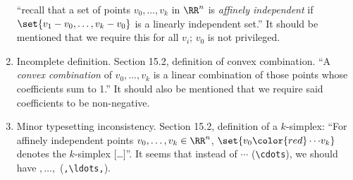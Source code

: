 \documentclass{fkletter}
\begin{document}
\begin{enumerate}
    ``recall that a set of points $v_0, \ldots, v_k$ in $\RR^n$ is
    \emph{affinely independent} if $\set{v_1 - v_0, \ldots, v_k - v_0}$ is a
    linearly independent set.'' It should be mentioned that we require this for
    all $v_i$; $v_0$ is not privileged.
  \item Incomplete definition. Section 15.2, definition of convex combination.
    ``A \emph{convex combination} of $v_0, \ldots, v_k$ is a linear combination
    of those points whose coefficients sum to 1.'' It should also be mentioned
    that we require said coefficients to be non-negative.
  \item Minor typesetting inconsistency. Section 15.2, definition of a
    $k$-simplex: ``For affinely independent points $v_0, \ldots, v_k \in \RR^n$,
    $\set{v_0 {\color{red} \cdots} v_k}$ denotes the $k$-simplex [\ldots]''. It
    seems that instead of $\cdots$ (\verb|\cdots|), we should have $,\ldots,$
    (\verb|,\ldots,|).
\end{enumerate}
\end{document}
